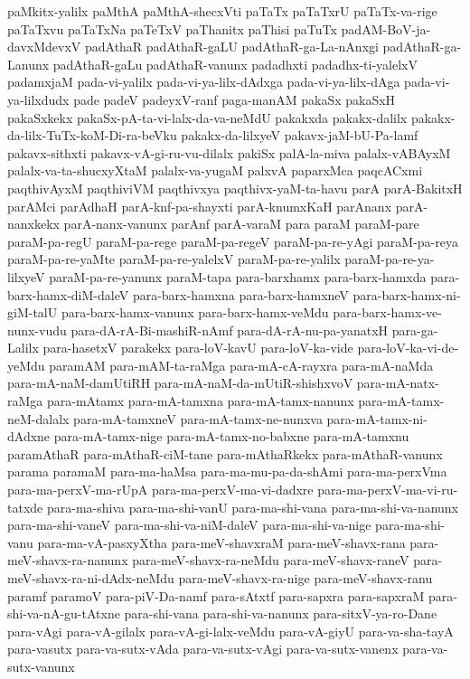 {paMkitx-yalilx
paMthA
paMthA-shecxVti
paTaTx
paTaTxrU
paTaTx-va-rige
paTaTxvu
paTaTx‌Na
paTeTxV
paThanitx
paThisi
paTuTx
padAM-BoV-ja-davxMdevxV
padAthaR
padAthaR-gaLU
padAthaR-ga-La-nAnxgi
padAthaR-ga-Lanunx
padAthaR-gaLu
padAthaR-vanunx
padadhxti
padadhx-ti-yalelxV
padamxjaM
pada-vi-yalilx
pada-vi-ya-lilx-dAdxga
pada-vi-ya-lilx-dAga
pada-vi-ya-lilxdudx
pade
padeV
padeyxV-ranf
paga-manAM
pakaSx
pakaSxH
pakaSxkekx
pakaSx-pA-ta-vi-lalx-da-va-neMdU
pakakxda
pakakx-dalilx
pakakx-da-lilx-TuTx-koM-Di-ra-beVku
pakakx-da-lilxyeV
pakavx-jaM-bU-Pa-lamf
pakavx-sithxti
pakavx-vA-gi-ru-vu-dilalx
pakiSx
palA-la-miva
palalx-vABAyxM
palalx-va-ta-shucxyXtaM
palalx-va-yugaM
palxvA
paparxMca
paqcACxmi
paqthivAyxM
paqthiviVM
paqthivxya
paqthivx-yaM-ta-havu
parA
parA-BakitxH
parAMci
parAdhaH
parA-knf-pa-shayxti
parA-knumxKaH
parAnanx
parA-nanxkekx
parA-nanx-vanunx
parAnf
parA-varaM
para
paraM
paraM-pare
paraM-pa-regU
paraM-pa-rege
paraM-pa-regeV
paraM-pa-re-yAgi
paraM-pa-reya
paraM-pa-re-yaMte
paraM-pa-re-yalelxV
paraM-pa-re-yalilx
paraM-pa-re-ya-lilxyeV
paraM-pa-re-yanunx
paraM-tapa
para-barxhamx
para-barx-hamxda
para-barx-hamx-diM-daleV
para-barx-hamxna
para-barx-hamxneV
para-barx-hamx-ni-giM-talU
para-barx-hamx-vanunx
para-barx-hamx-veMdu
para-barx-hamx-ve-nunx-vudu
para-dA-rA-Bi-mashiR-nAmf
para-dA-rA-nu-pa-yanatxH
para-ga-Lalilx
para-hasetxV
parakekx
para-loV-kavU
para-loV-ka-vide
para-loV-ka-vi-de-yeMdu
paramAM
para-mAM-ta-raMga
para-mA-cA-rayxra
para-mA-naMda
para-mA-naM-damUtiRH
para-mA-naM-da-mUtiR-shishxvoV
para-mA-natx-raMga
para-mAtamx
para-mA-tamxna
para-mA-tamx-nanunx
para-mA-tamx-neM-dalalx
para-mA-tamxneV
para-mA-tamx-ne-nunxva
para-mA-tamx-ni-dAdxne
para-mA-tamx-nige
para-mA-tamx-no-babxne
para-mA-tamxnu
paramAthaR
para-mAthaR-ciM-tane
para-mAthaRkekx
para-mAthaR-vanunx
parama
paramaM
para-ma-haMsa
para-ma-mu-pa-da-shAmi
para-ma-perxVma
para-ma-perxV-ma-rUpA
para-ma-perxV-ma-vi-dadxre
para-ma-perxV-ma-vi-ru-tatxde
para-ma-shiva
para-ma-shi-vanU
para-ma-shi-vana
para-ma-shi-va-nanunx
para-ma-shi-vaneV
para-ma-shi-va-niM-daleV
para-ma-shi-va-nige
para-ma-shi-vanu
para-ma-vA-pasxyXtha
para-meV-shavxraM
para-meV-shavx-rana
para-meV-shavx-ra-nanunx
para-meV-shavx-ra-neMdu
para-meV-shavx-raneV
para-meV-shavx-ra-ni-dAdx-neMdu
para-meV-shavx-ra-nige
para-meV-shavx-ranu
paramf
paramoV
para-piV-Da-namf
para-sAtxtf
para-sapxra
para-sapxraM
para-shi-va-nA-gu-tAtxne
para-shi-vana
para-shi-va-nanunx
para-sitxV-ya-ro-Dane
para-vAgi
para-vA-gilalx
para-vA-gi-lalx-veMdu
para-vA-giyU
para-va-sha-tayA
para-vasutx
para-va-sutx-vAda
para-va-sutx-vAgi
para-va-sutx-vanenx
para-va-sutx-vanunx
}
